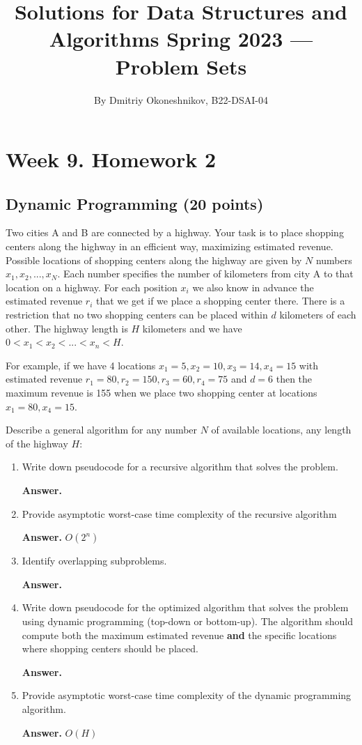\documentclass{article}
\title{Solutions for Data Structures and Algorithms Spring 2023 — Problem Sets}
\author{By Dmitriy Okoneshnikov, B22-DSAI-04}
\begin{document}
\maketitle

\section*{Week 9. Homework 2}

\setcounter{section}{3}
\subsection{Dynamic Programming (20 points)}

Two cities A and B are connected by a highway. Your task is to place shopping centers along the highway in an efficient way, maximizing estimated revenue. Possible locations of shopping centers along the highway are given by $N$ numbers $x_1, x_2, ..., x_N$. Each number specifies the number of kilometers from city A to that location on a highway. For each position $x_i$ we also know in advance the estimated revenue $r_i$ that we get if we place a shopping center there. There is a restriction that no two shopping centers can be placed within $d$ kilometers of each other. The highway length is $H$ kilometers and we have $0 < x_1 < x_2 < ... < x_n < H$.

For example, if we have 4 locations $x_1 = 5, x_2 = 10, x_3 = 14, x_4 = 15$ with estimated revenue $r_1 = 80, r_2 = 150, r_3 = 60, r_4 = 75$ and $d = 6$ then the maximum revenue is 155 when we place two shopping center at locations $x_1 = 80, x_4 = 15$.

Describe a general algorithm for any number $N$ of available locations, any length of the highway $H$:
\begin{enumerate}
    \item Write down pseudocode for a recursive algorithm that solves the problem.
   
    \textbf{Answer.}

    
    
    \item Provide asymptotic worst-case time complexity of the recursive algorithm

    \textbf{Answer.} $O(2^n)$
    
    \item Identify overlapping subproblems.

    \textbf{Answer.}
    
    \item Write down pseudocode for the optimized algorithm that solves the problem using dynamic programming (top-down or bottom-up). The algorithm should compute both the maximum estimated revenue \textbf{and} the specific locations where shopping centers should be placed.

    \textbf{Answer.}
    
    \item Provide asymptotic worst-case time complexity of the dynamic programming algorithm.

    \textbf{Answer.} $O(H)$
    
\end{enumerate}
\end{document}

